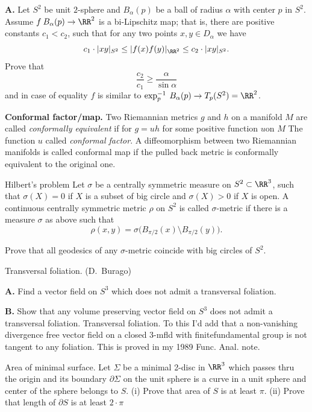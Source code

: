 {\bf A.} Let $S^2$ be unit $2$-sphere and
$B_\alpha(p)$ be a ball of
radius $\alpha$ with center $p$ in $S^2$.
Assume $f\:B_\alpha(p)\to \RR^2$ is a bi-Lipschitz map;
that is, there are positive constants $c_1 < c_2$, such that for any two points
$x,y\in D_\alpha$ we have
$$c_1\cdot |x y|_{S^2}\le |f(x)f(y)|_{\RR^2} \le c_2\cdot|x y|_{S^2}.$$
Prove that
$$\frac{c_2}{c_1}\ge \frac{\alpha}{\sin\alpha}$$
and in case of equality
$f$ is similar to $\exp_p^{-1}\:B_\alpha(p)\to T_p(S^2)=\RR^2$.

\item{\bf Conformal factor/map.} Two Riemannian metrics $g$ and $h$ on a manifold $M$ are called {\it conformally equivalent} if for $g=u h$ for some positive function $u$on $M$
The function $u$ called {\it conformal factor}.
A diffeomorphism between two Riemannian manifolds is called conformal map if the pulled back metric is conformally equivalent to the original one.

\begin{pr}{}{Hilbert's problem} Let $\sigma$ be a centrally
symmetric measure on $S^2\subset \RR^3$, such that $\sigma(X)=0$ if $X$ is a
subset of big circle and $\sigma(X)>0$ if $X$ is open.
A continuous centrally symmetric metric $\rho$ on $S^2$
is called $\sigma$-metric
if there is a measure $\sigma$ as above such that
$$\rho(x,y)=\sigma\bigl(B_{\pi/2}(x)\setminus B_{\pi/2}(y)\bigr).$$

Prove that all geodesics of any $\sigma$-metric coincide with big circles
of $S^2$.
\end{pr}

\begin{pr}{}
{Transversal foliation.} (D.~Burago)

{\bf A.} Find a vector field on $S^3$ which does not admit a transversal foliation.

{\bf B.} Show that any volume preserving vector field on $S^3$ does not admit a transversal foliation.
Transversal foliation. To this I'd add that a non-vanishing divergence free vector field on a closed 3-mfld with finitefundamental group is not tangent to any foliation. This is proved in my 1989 Func. Anal. note.
\end{pr}

\begin{pr}{}{Area of minimal surface.} Let $\Sigma$ be a minimal 2-disc in $\RR^3$ which passes thru the origin and its boundary $\partial\Sigma$ on the unit sphere is a curve in a unit sphere and center of the sphere belongs to $S$.
(i) Prove that area of $S$ is at least $\pi$.
(ii) Prove that length of $\partial S$ is at least $2\cdot\pi$
\end{pr}

